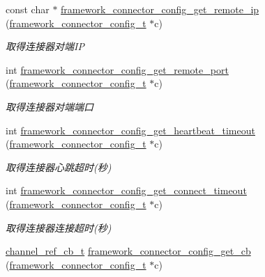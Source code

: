 \begin{DoxyCompactItemize}
const char $\ast$ \hyperlink{a00054_a0fbfc87ecd9e3f9eb5e2b11cb41492c0_a0fbfc87ecd9e3f9eb5e2b11cb41492c0}{framework\+\_\+connector\+\_\+config\+\_\+get\+\_\+remote\+\_\+ip} (\hyperlink{a00050_a81253f4c995b97e69be0e67f7a26097f_a81253f4c995b97e69be0e67f7a26097f}{framework\+\_\+connector\+\_\+config\+\_\+t} $\ast$c)
\begin{DoxyCompactList}\small\item\em 取得连接器对端\+I\+P \end{DoxyCompactList}\item 
int \hyperlink{a00054_a431430a477e5bd3b2f5d1cdd086d9e26_a431430a477e5bd3b2f5d1cdd086d9e26}{framework\+\_\+connector\+\_\+config\+\_\+get\+\_\+remote\+\_\+port} (\hyperlink{a00050_a81253f4c995b97e69be0e67f7a26097f_a81253f4c995b97e69be0e67f7a26097f}{framework\+\_\+connector\+\_\+config\+\_\+t} $\ast$c)
\begin{DoxyCompactList}\small\item\em 取得连接器对端端口 \end{DoxyCompactList}\item 
int \hyperlink{a00054_a09b5a84e743f5631978265baa74fc9df_a09b5a84e743f5631978265baa74fc9df}{framework\+\_\+connector\+\_\+config\+\_\+get\+\_\+heartbeat\+\_\+timeout} (\hyperlink{a00050_a81253f4c995b97e69be0e67f7a26097f_a81253f4c995b97e69be0e67f7a26097f}{framework\+\_\+connector\+\_\+config\+\_\+t} $\ast$c)
\begin{DoxyCompactList}\small\item\em 取得连接器心跳超时(秒) \end{DoxyCompactList}\item 
int \hyperlink{a00054_a8ae50af498b76007307c7ef858dbe345_a8ae50af498b76007307c7ef858dbe345}{framework\+\_\+connector\+\_\+config\+\_\+get\+\_\+connect\+\_\+timeout} (\hyperlink{a00050_a81253f4c995b97e69be0e67f7a26097f_a81253f4c995b97e69be0e67f7a26097f}{framework\+\_\+connector\+\_\+config\+\_\+t} $\ast$c)
\begin{DoxyCompactList}\small\item\em 取得连接器连接超时(秒) \end{DoxyCompactList}\item 
\hyperlink{a00050_ae296ec4d1ce108960de8dcc423956a1d_ae296ec4d1ce108960de8dcc423956a1d}{channel\+\_\+ref\+\_\+cb\+\_\+t} \hyperlink{a00054_a234e77f6481ee4af04abce8951f0ea73_a234e77f6481ee4af04abce8951f0ea73}{framework\+\_\+connector\+\_\+config\+\_\+get\+\_\+cb} (\hyperlink{a00050_a81253f4c995b97e69be0e67f7a26097f_a81253f4c995b97e69be0e67f7a26097f}{framework\+\_\+connector\+\_\+config\+\_\+t} $\ast$c)

\end{DoxyCompactItemize}
